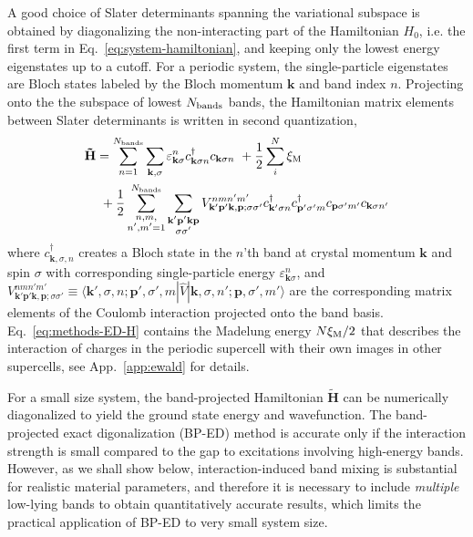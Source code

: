 \documentclass[
 reprint,
 amsmath,amssymb,
 aps, prx,
floatfix,longbibliography,
]{revtex4-2}
\begin{document}
A good choice of Slater determinants spanning the variational subspace is obtained by diagonalizing the non-interacting part of the Hamiltonian $H_0$, i.e. the first term in Eq.~\eqref{eq:system-hamiltonian}, and keeping only the lowest energy eigenstates up to a cutoff. For a periodic system, the single-particle eigenstates are Bloch states labeled by the Bloch momentum $\bm k$ and band index $n$. Projecting onto the the subspace of lowest $N_{\rm bands}$ bands, the Hamiltonian matrix elements between Slater determinants is written in second quantization,
\begin{align}
    \mathbf{\tilde{H}}& = \sum_{n=1}^{N_{\rm bands}}\sum_{\mathbf{k},\sigma}\varepsilon_{\mathbf{k}\sigma}^nc_{\mathbf{k}\sigma n}^\dagger c_{\mathbf{k}\sigma n} \  + \frac{1}{2} \sum_i^N \xi_{\rm M}\nonumber \\
    & \ + \frac{1}{2} \sum_{\substack{n,m,\\n',m'=1}}^{N_{\rm bands}} \sum_{\substack{\mathbf{k'}\mathbf{p'}\mathbf{k}\mathbf{p}\\ \sigma\sigma'}} V^{nmn'm'}_{\mathbf{k'}\mathbf{p'}\mathbf{k},\mathbf{p};\sigma\sigma'} c_{\mathbf{k'}\sigma n}^\dagger c_{\mathbf{p'}\sigma' m}^\dagger c_{\mathbf{p}\sigma' m'} c_{\mathbf{k}\sigma n'}
    \label{eq:methods-ED-H}
\end{align}
where $c_{\mathbf{k},\sigma,n}^\dagger$ creates a Bloch state in the $n$'th band at crystal momentum $\mathbf{k}$ and spin $\sigma$ with corresponding single-particle energy $\varepsilon_{\mathbf{k}\sigma}^n$, and $V_{\mathbf{k'}\mathbf{p'}\mathbf{k},\mathbf{p};\sigma\sigma'}^{nmn'm'} \equiv \langle \mathbf{k'},\sigma, n;\mathbf{p'},\sigma',m|\hat{V}|\mathbf{k},\sigma,n';\mathbf{p},\sigma',m' \rangle$ are the corresponding matrix elements of the Coulomb interaction projected onto the band basis. Eq.~\eqref{eq:methods-ED-H} contains the Madelung energy $N \xi_{\rm M}/2$ that describes the interaction of charges in the periodic supercell with their own images in other supercells, see App.~\ref{app:ewald} for details.

For a small size system, the band-projected Hamiltonian $\mathbf{\tilde{H}}$ can be numerically diagonalized to yield the ground state energy and wavefunction. The band-projected exact digonalization (BP-ED) method is accurate only if the interaction strength is small compared to the gap to excitations involving high-energy bands. 
However, as we shall show below, interaction-induced band mixing is substantial for realistic material parameters, and therefore it is necessary to include {\it multiple} low-lying bands to obtain quantitatively accurate results, which limits the practical application of BP-ED to very small system size.               
\end{document}
